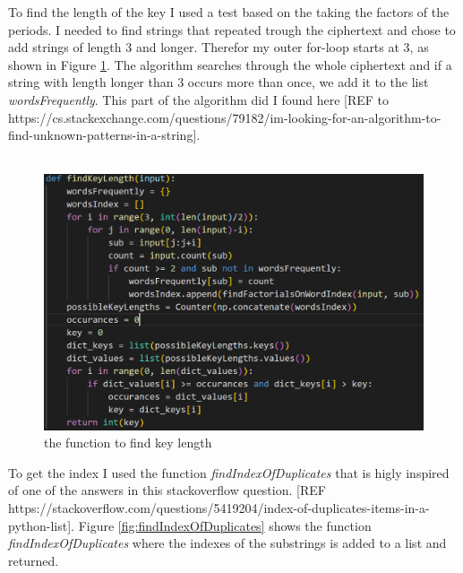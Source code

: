 \documentclass[12pt, letterpaper]{article}
\begin{document}
To find the length of the key I used a test based on the taking the factors of the periods. I needed to find strings that repeated trough the ciphertext and chose to add strings of length 3 and longer. Therefor my outer for-loop starts at 3, as shown in Figure \ref{fig:findKeyLength}. The algorithm searches through the whole ciphertext and if a string with length longer than 3 occurs more than once, we add it to the list \textit{wordsFrequently}. This part of the algorithm did I found here [REF to https://cs.stackexchange.com/questions/79182/im-looking-for-an-algorithm-to-find-unknown-patterns-in-a-string]. 
\\ \\
\begin{figure}[H]
  \includegraphics[width=\linewidth]{code_snippets/findKeyLength.PNG}
  \caption{the function to find key length}
  \label{fig:findKeyLength}
\end{figure}

To get the index I used the function \textit{findIndexOfDuplicates} that is higly inspired of one of the answers in this stackoverflow question. [REF https://stackoverflow.com/questions/5419204/index-of-duplicates-items-in-a-python-list]. Figure \ref{fig:findIndexOfDuplicates} shows the function \textit{findIndexOfDuplicates} where the indexes of the substrings is added to a list and returned. \\ \\
\end{document}
